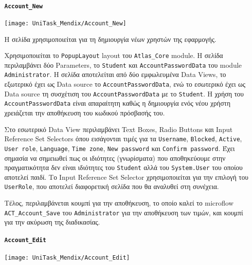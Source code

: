                 \paragraph{\texttt{Account\_New}}
                    \begin{center}
                        \texttt{[image: UniTask\_Mendix/Account\_New]}
                    \end{center}

                    Η σελίδα χρησιμοποιείται για τη δημιουργία νέων χρηστών της εφαρμογής.

                    Χρησιμοποιείται το \texttt{PopupLayout} layout του \texttt{Atlas\_Core} module. Η σελίδα περιλαμβάνει δύο Parameters, το \texttt{Student} και \texttt{AccountPasswordData} του module \linebreak \texttt{Administrator}. Η σελίδα αποτελείται από δύο εμφωλευμένα Data Views, το εξωτερικό έχει ως Data source το \texttt{AccountPasswordData}, ενώ το εσωτερικό έχει ως Data source τη συσχέτιση του \texttt{AccountPasswordData} με το \texttt{Student}. Η χρήση του \texttt{AccountPasswordData} είναι απαραίτητη καθώς η δημιουργία ενός νέου χρήστη χρειάζεται την αποθήκευση του κωδικού πρόσβασής του.

                    Στο εσωτερικό Data View περιλαμβάνει Text Boxes, Radio Buttons και Input \linebreak Reference Set Selectors όπου εισάγονται τιμές για τα \texttt{Username}, \texttt{Blocked}, \texttt{Active}, \texttt{User role}, \texttt{Language}, \texttt{Time zone}, \texttt{New password} και \texttt{Confirm password}. Έχει σημασία να σημειωθεί πως οι ιδιότητες (γνωρίσματα) που αποθηκεύουμε στην πραγματικότητα δεν είναι ιδιότητες του \texttt{Student} αλλά του \texttt{System.User} του οποίου αποτελεί παιδί. Το Input Reference Set Selector χρησιμοποιείται για την επιλογή του \texttt{UserRole}, που αποτελεί διαφορετική σελίδα που θα αναλυθεί στη συνέχεια.

                    Τέλος, περιλαμβάνεται κουμπί για την αποθήκευση, το οποίο καλεί το microflow \texttt{ACT\_Account\_Save} του \texttt{Administrator} για την αποθήκευση των τιμών, και κουμπί για την ακύρωση της διαδικασίας.

                \paragraph{\texttt{Account\_Edit}}
                    \begin{center}
                        \texttt{[image: UniTask\_Mendix/Account\_Edit]}
                    \end{center}

